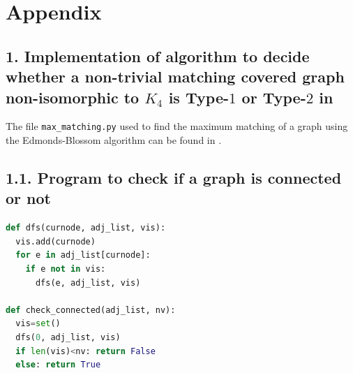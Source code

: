 \documentclass[11pt]{article}
\begin{document}



\bigskip

\section*{Appendix}

\subsection*{1. Implementation of algorithm to decide whether a non-trivial matching covered graph non-isomorphic to $K_4$ is Type-$1$ or Type-$2$ in \cite{chandran_gajjala1000}}\medskip
The file \texttt{max\_matching.py} used to find the maximum matching of a graph using the Edmonds-Blossom algorithm can be found in \cite{edmonds-blossom}.
\subsection*{1.1. Program to check if a graph is connected or not}
\begin{lstlisting}[language=Python]
def dfs(curnode, adj_list, vis):
  vis.add(curnode)
  for e in adj_list[curnode]:
    if e not in vis:
      dfs(e, adj_list, vis)

def check_connected(adj_list, nv):
  vis=set()
  dfs(0, adj_list, vis)
  if len(vis)<nv: return False
  else: return True    
\end{lstlisting}
\end{document}
